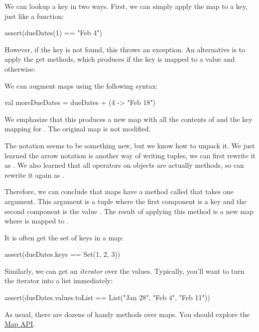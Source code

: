 \documentclass[9pt]{extbook}
\begin{document}
We can lookup a key in two ways. First, we can simply apply the map to a key,
just like a function:
\begin{scalacode}
assert(dueDates(1) == "Feb 4")
\end{scalacode}

However, if the key is not found, this throws an exception. An alternative
is to apply the get methods, which produces  if the
key is mapped to a value and  otherwise:
%
\begin{scalacode}
dueDates.get(x) match {
  case Some(v) => v
  case None => "Unknown assignment"
\end{scalacode}

We can augment maps using the following syntax:
\begin{scalacode}
val moreDueDates = dueDates + (4 -> "Feb 18")
\end{scalacode}
We emphasize that this produces a new map with all the contents of
 and the key mapping for .
The original map is not modified.

\begin{notation}
The notation  seems to be something
new, but we know how to unpack it. We just learned the arrow notation is
another way of writing tuples, we can first rewrite it as .
We also learned that all operators on objects are actually methods, so
can rewrite it again as .

Therefore, we can conclude that maps have a method called \scalainline{+} that
takes one argument. This argument is a tuple where the first component is a key
 and the second component is the value . The
result of applying this method is a new map where  is mapped to
.
\end{notation}

It is often get the set of keys in a map:
\begin{scalacode}
assert(dueDates.keys == Set(1, 2, 3))
\end{scalacode}

Similarly, we can get an \emph{iterator} over the values. Typically, you'll
want to turn the iterator into a list immediately:
\begin{scalacode}
assert(dueDates.values.toList == List("Jan 28", "Feb 4", "Feb 11"))
\end{scalacode}

As usual, there are dozens of handy methods over maps. You should
explore the \href{http://www.scala-lang.org/api/2.11.7/index.html#scala.collection.Map}{Map API}.
\end{document}
